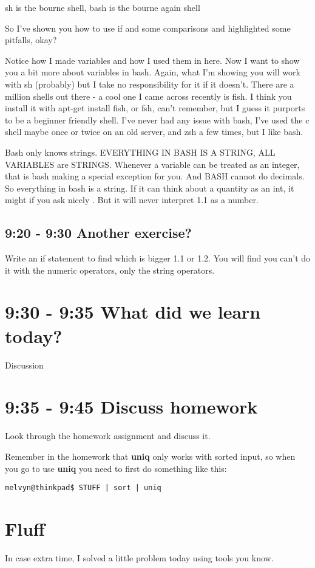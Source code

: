 \documentclass[12pt,a4paper]{article}
\begin{document}
sh is the bourne shell, bash is the bourne again shell

So I've shown you how to use if and some comparisons and highlighted some pitfalls, okay?

Notice how I made variables and how I used them in here. Now I want to show you a bit more about variables in bash. Again, what I'm showing you will work with sh (probably) but I take no responsibility for it if it doesn't. There are a million shells out there - a cool one I came across recently is fish. I think you install it with apt-get install fish, or fsh, can't remember, but I guess it purports to be a beginner friendly shell. I've never had any issue with bash, I've used the c shell maybe once or twice on an old server, and zsh a few times, but I like bash.

Bash only knows strings. EVERYTHING IN BASH IS A STRING, ALL VARIABLES are
STRINGS. Whenever a variable can be treated as an integer, that is bash making a
special exception for you. And BASH cannot do decimals. So everything in bash is
a string. If it can think about a quantity as an int, it might if you ask nicely
. But it will never interpret 1.1 as a number. 

\subsection{9:20 - 9:30 Another exercise?}
Write an if statement to find which is bigger 1.1 or 1.2. You will find you
can't do it with the numeric operators, only the string operators.

\section{9:30 - 9:35 What did we learn today?}
Discussion


\section{9:35 - 9:45 Discuss homework}
Look through the homework assignment and discuss it.

Remember in the homework that \textbf{uniq} only works with sorted input, so
when you go to use \textbf{uniq} you need to first do something like this:

\begin{lstlisting}[style=term]
melvyn@thinkpad$ STUFF | sort | uniq
\end{lstlisting}

\section{Fluff}
In case extra time, I solved a little problem today using tools you know.
\end{document}
